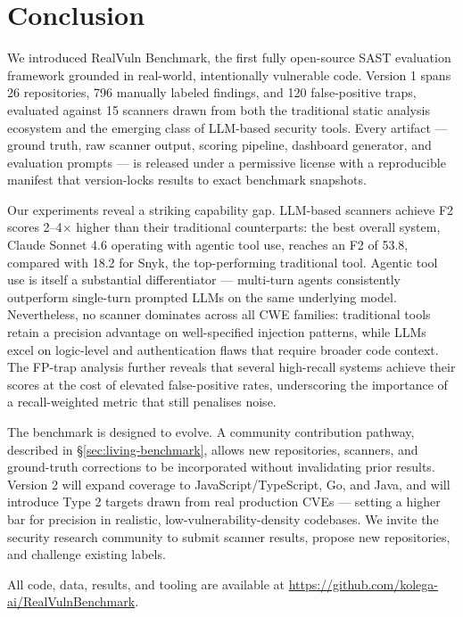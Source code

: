 \section{Conclusion}

We introduced RealVuln Benchmark, the first fully open-source SAST evaluation
framework grounded in real-world, intentionally vulnerable code.  Version 1
spans 26 repositories, 796 manually labeled findings, and 120 false-positive
traps, evaluated against 15 scanners drawn from both the traditional static
analysis ecosystem and the emerging class of LLM-based security tools.  Every
artifact --- ground truth, raw scanner output, scoring pipeline, dashboard
generator, and evaluation prompts --- is released under a permissive license
with a reproducible manifest that version-locks results to exact benchmark
snapshots.

Our experiments reveal a striking capability gap.  LLM-based scanners achieve
F2 scores 2--4$\times$ higher than their traditional counterparts: the best
overall system, Claude Sonnet 4.6 operating with agentic tool use, reaches an
F2 of 53.8, compared with 18.2 for Snyk, the top-performing traditional tool.
Agentic tool use is itself a substantial differentiator --- multi-turn agents
consistently outperform single-turn prompted LLMs on the same underlying model.
Nevertheless, no scanner dominates across all CWE families: traditional tools
retain a precision advantage on well-specified injection patterns, while LLMs
excel on logic-level and authentication flaws that require broader code context.
The FP-trap analysis further reveals that several high-recall systems achieve
their scores at the cost of elevated false-positive rates, underscoring the
importance of a recall-weighted metric that still penalises noise.

The benchmark is designed to evolve.  A community contribution pathway,
described in \S\ref{sec:living-benchmark}, allows new repositories, scanners,
and ground-truth corrections to be incorporated without invalidating prior
results.  Version 2 will expand coverage to JavaScript/TypeScript, Go, and
Java, and will introduce Type 2 targets drawn from real production CVEs ---
setting a higher bar for precision in realistic, low-vulnerability-density
codebases.  We invite the security research community to submit scanner results,
propose new repositories, and challenge existing labels.

All code, data, results, and tooling are available at
\url{https://github.com/kolega-ai/RealVulnBenchmark}.

